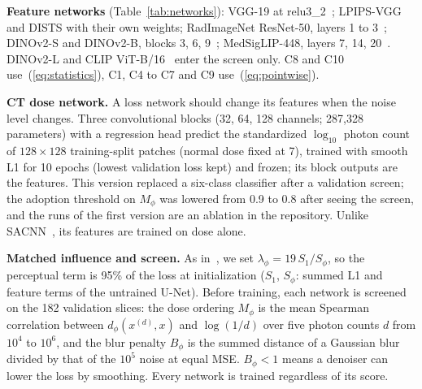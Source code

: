\textbf{Feature networks} (Table~\ref{tab:networks}): VGG-19 at relu3\_2~\cite{simonyan2015vgg};
LPIPS-VGG~\cite{zhang2018lpips} and DISTS with their own weights; RadImageNet ResNet-50, layers 1 to
3~\cite{mei2022radimagenet}; DINOv2-S and DINOv2-B, blocks 3, 6, 9~\cite{oquab2024dinov2}; MedSigLIP-448, layers 7, 14,
20~\cite{sellergren2025medgemma}. DINOv2-L and CLIP ViT-B/16~\cite{radford2021clip} enter the screen only. C8 and C10
use~(\ref{eq:statistics}), C1, C4 to C7 and C9 use~(\ref{eq:pointwise}).

\textbf{CT dose network.} A loss network should change its features when the noise level changes. Three
convolutional blocks (32, 64, 128 channels; 287,328 parameters) with a regression head predict the standardized $\log_{10}$ photon count of $128 \times 128$ training-split patches (normal dose fixed at 7),
trained with smooth L1 for 10 epochs (lowest validation loss kept) and frozen; its block outputs are the features. This
version replaced a six-class classifier after a validation screen; the adoption threshold on $M_\phi$ was lowered
from 0.9 to 0.8 after seeing the screen, and the runs of the first version are an ablation in the repository. Unlike SACNN~\cite{li2020sacnn}, its features
are trained on dose alone.

\textbf{Matched influence and screen.} As in~\cite{viana2025perceptual}, we set $\lambda_\phi = 19 \, S_1 / S_\phi$,
so the perceptual term is 95\% of the loss at initialization ($S_1$, $S_\phi$: summed L1 and feature terms of the untrained
U-Net). Before training, each network is screened on the 182 validation slices: the dose ordering $M_\phi$ is the mean
Spearman correlation between $d_\phi(x^{(d)}, x)$ and $\log(1/d)$ over five photon counts $d$ from $10^4$ to $10^6$,
and the blur penalty $B_\phi$ is the summed distance of a Gaussian blur divided by that of the $10^5$ noise at equal
MSE. $B_\phi < 1$ means a denoiser can lower the loss by smoothing. Every network is trained regardless of its score.


